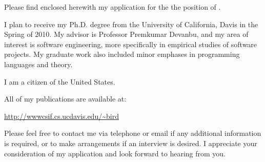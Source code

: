 \documentclass[\@textsize]{newlfm}
\begin{document}
\greetto{\@greeting} 

\begin{newlfm} 

Please find enclosed herewith my application for the the position of
\@jobposition 
\@joblocation.

I plan to receive my Ph.D. degree from the University of California, Davis in
the Spring of 2010.  My advisor is Professor Premkumar Devanbu, and my area of
interest is software engineering, more specifically in empirical studies of
software projects.  My graduate work also included minor emphases in 
programming languages and theory.

I am a citizen of the United States.

\@enclosedtext

All of my publications are available at:

{\small \url{http://wwwcsif.cs.ucdavis.edu/~bird}}

Please feel free to contact me via telephone or email if any additional
information is required, or to make arrangements if an interview is desired.
I appreciate your consideration of my application and look forward to hearing from
you.

\end{newlfm} 
\end{document}
